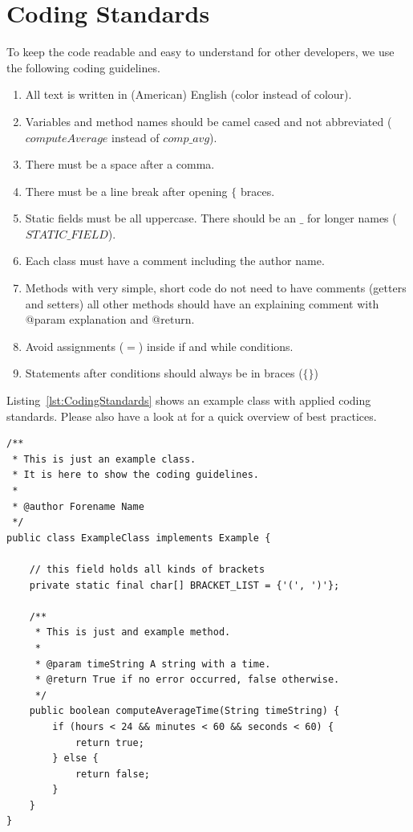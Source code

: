 \documentclass[a4paper,twoside]{book}      %
\begin{document}
\section{Coding Standards}
To keep the code readable and easy to understand for other developers, we use the following coding guidelines.
\begin{enumerate}
\item All text is written in (American) English (color instead of colour).
\item Variables and method names should be camel cased and not abbreviated ($computeAverage$ instead of $comp\_avg$).
\item There must be a space after a comma.
\item There must be a line break after opening $\{$ braces.
\item Static fields must be all uppercase. There should be an $\_$ for longer names ($STATIC\_FIELD$).
\item Each class must have a comment including the author name.
\item Methods with very simple, short code do not need to have comments (getters and setters) all other methods should have an explaining comment with @param explanation and @return.
\item Avoid assignments ($=$) inside if and while conditions.
\item Statements after conditions should always be in braces ($\{\}$)
\end{enumerate}

Listing~\ref{lst:CodingStandards} shows an example class with applied coding standards. Please also have a look at \cite{codingStandards} for a quick overview of best practices.

\begin{codelisting}
\begin{lstlisting}[caption=Example class for coding guidelines,label=lst:CodingStandards,frame=tb]
/**
 * This is just an example class.
 * It is here to show the coding guidelines.
 * 
 * @author Forename Name
 */
public class ExampleClass implements Example {

	// this field holds all kinds of brackets
	private static final char[] BRACKET_LIST = {'(', ')'};

	/**
	 * This is just and example method.
	 * 
	 * @param timeString A string with a time.
	 * @return True if no error occurred, false otherwise.
	 */
	public boolean computeAverageTime(String timeString) {
		if (hours < 24 && minutes < 60 && seconds < 60) {
			return true;
		} else {
			return false;
		}
	}
}
\end{lstlisting}
\end{codelisting}
\end{document}
